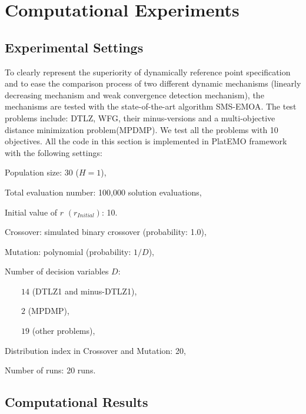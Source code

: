 \documentclass[conference]{IEEEtran}
\begin{document}
\section{Computational Experiments}
\subsection{Experimental Settings}
To clearly represent the superiority of dynamically reference point specification 
and to ease the comparison process of two different dynamic mechanisms
(linearly decreasing mechanism and weak convergence detection mechanism), 
the mechanisms are tested with the state-of-the-art algorithm SMS-EMOA\cite{smsemoa}.
The test problems include: 
DTLZ\cite{DTLZ}, WFG\cite{WFG}, their minus-versions\cite{minusTestProblem} 
and a multi-objective distance minimization problem(MPDMP)\cite{dmp}.
We test all the problems with 10 objectives. 
All the code in this section is implemented in PlatEMO framework\cite{PlatEMO} 
with the following settings:

Population size: 30 ($H=1$), 

Total evaluation number: 100,000 solution evaluations,

Initial value of $r$ $(r_{Initial})$: 10.

Crossover: simulated binary crossover (probability: 1.0),

Mutation: polynomial (probability: $1/D$),

Number of decision variables $D$:

$\qquad 14$ (DTLZ1 and minus-DTLZ1),

$\qquad 2$ (MPDMP),

$\qquad 19$ (other problems),

Distribution index in Crossover and Mutation: 20, 

Number of runs: 20 runs.

% 
\subsection{Computational Results}
\end{document}
